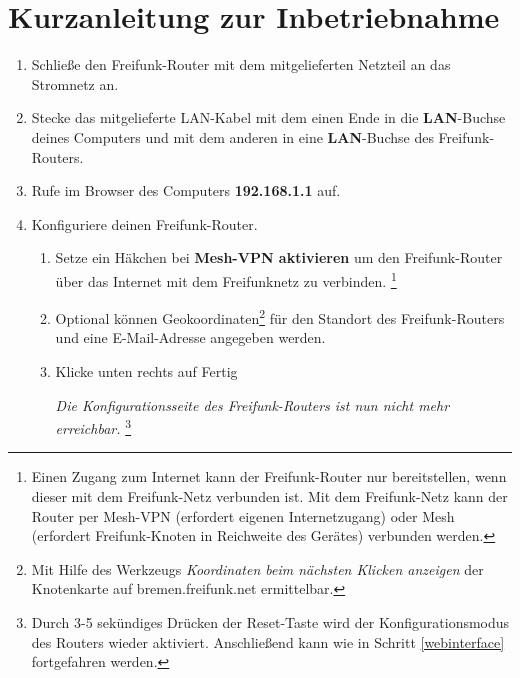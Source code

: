 \documentclass{article}
\begin{document}
\section*{Kurzanleitung zur Inbetriebnahme}

\begin{enumerate}
\item Schließe den Freifunk-Router mit dem mitgelieferten Netzteil an das Stromnetz an.

%

\item Stecke das mitgelieferte LAN-Kabel mit dem einen Ende in die \textbf{LAN}-Buchse deines Computers und mit dem anderen in eine \textbf{LAN}-Buchse des Freifunk-Routers.

\item Rufe im Browser des Computers \textbf{192.168.1.1} auf. \label{webinterface}

\item Konfiguriere deinen Freifunk-Router. 
\begin{enumerate}

%
  \item Setze ein Häkchen bei \glqq{}\textbf{Mesh-VPN aktivieren}\grqq{} um den Freifunk-Router über das Internet mit dem Freifunknetz zu verbinden. \label{vpn-mesh-aktivieren} \footnote{Einen Zugang zum Internet kann der Freifunk-Router nur bereitstellen, wenn dieser mit dem Freifunk-Netz verbunden ist. Mit dem Freifunk-Netz kann der Router per Mesh-VPN (erfordert eigenen Internetzugang) oder Mesh (erfordert Freifunk-Knoten in Reichweite des Gerätes) verbunden werden.}
  
  \item Optional können Geokoordinaten\footnote{Mit Hilfe des Werkzeugs \textit{Koordinaten beim nächsten Klicken anzeigen} der Knotenkarte auf bremen.freifunk.net ermittelbar.} für den Standort des Freifunk-Routers und eine E-Mail-Adresse angegeben werden.

  \item Klicke unten rechts auf \glqq{}Fertig\grqq{} \label{fertig}

  \textit{Die Konfigurationsseite des Freifunk-Routers ist nun nicht mehr erreichbar.} \footnote{Durch 3-5 sekündiges Drücken der Reset-Taste wird der Konfigurationsmodus des Routers wieder aktiviert. Anschließend kann wie in Schritt \ref{webinterface} fortgefahren werden.}
\end{enumerate}


\end{enumerate}
\end{document}
